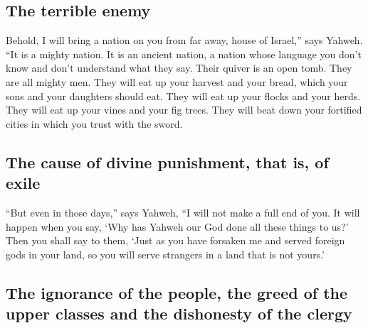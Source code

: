 \hypertarget{the-terrible-enemy}{%
\subsection{The terrible enemy}\label{the-terrible-enemy}}

 Behold, I will bring a nation on you from far away,
house of Israel,'' says Yahweh. ``It is a mighty nation. It is an
ancient nation, a nation whose language you don't know and don't
understand what they say.  Their quiver is an open tomb.
They are all mighty men.  They will eat up your harvest
and your bread, which your sons and your daughters should eat. They will
eat up your flocks and your herds. They will eat up your vines and your
fig trees. They will beat down your fortified cities in which you trust
with the sword.

\hypertarget{the-cause-of-divine-punishment-that-is-of-exile}{%
\subsection{The cause of divine punishment, that is, of
exile}\label{the-cause-of-divine-punishment-that-is-of-exile}}

 ``But even in those days,'' says Yahweh, ``I will not
make a full end of you.  It will happen when you say,
`Why has Yahweh our God done all these things to us?' Then you shall say
to them, `Just as you have forsaken me and served foreign gods in your
land, so you will serve strangers in a land that is not yours.'

\hypertarget{the-ignorance-of-the-people-the-greed-of-the-upper-classes-and-the-dishonesty-of-the-clergy}{%
\subsection{The ignorance of the people, the greed of the upper classes
and the dishonesty of the
clergy}\label{the-ignorance-of-the-people-the-greed-of-the-upper-classes-and-the-dishonesty-of-the-clergy}}

